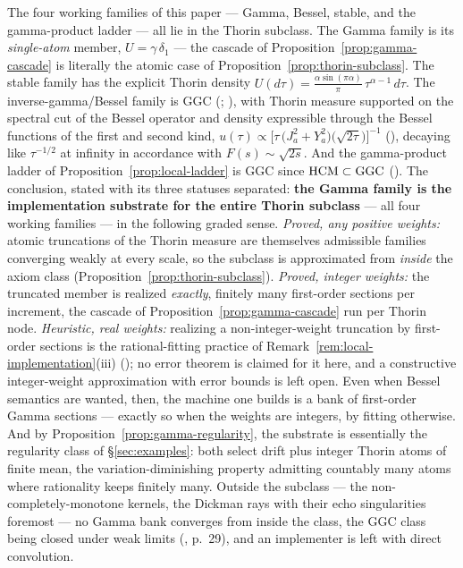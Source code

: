 The four working families of this paper --- Gamma, Bessel, stable, and the gamma-product
ladder --- all lie in the Thorin subclass. The Gamma family is its
\emph{single-atom} member, $U = \gamma\,\delta_1$ --- the cascade of
Proposition~\ref{prop:gamma-cascade} is literally the atomic case of
Proposition~\ref{prop:thorin-subclass}. The stable family has the explicit Thorin density
$U(d\tau) = \tfrac{\alpha \sin(\pi\alpha)}{\pi}\,\tau^{\alpha - 1}\,d\tau$. The
inverse-gamma/Bessel family is GGC (;
), with Thorin measure supported on the spectral cut of the
Bessel operator and density expressible through the Bessel functions of the first and second
kind, $u(\tau) \propto \bigl[\tau\,\bigl(J_a^2 + Y_a^2\bigr)\bigl(\sqrt{2\tau}\bigr)\bigr]^{-1}$
(), decaying like $\tau^{-1/2}$ at infinity in accordance with
$F(s) \sim \sqrt{2s}$. And the gamma-product ladder of Proposition~\ref{prop:local-ladder} is
GGC since $\mathrm{HCM} \subset \mathrm{GGC}$ (). The conclusion, stated
with its three statuses separated: \textbf{the Gamma family is the
implementation substrate for the entire Thorin subclass} --- all four working families ---
in the following graded sense. \emph{Proved, any positive weights:} atomic truncations of
the Thorin measure are themselves admissible families converging weakly at every scale, so
the subclass is approximated from \emph{inside} the axiom class
(Proposition~\ref{prop:thorin-subclass}). \emph{Proved, integer weights:} the truncated
member is realized \emph{exactly}, finitely many first-order sections per increment, the
cascade of Proposition~\ref{prop:gamma-cascade} run per Thorin node. \emph{Heuristic, real
weights:} realizing a non-integer-weight truncation by first-order sections is the
rational-fitting practice of Remark~\ref{rem:local-implementation}(iii)
(); no error theorem is claimed for it here, and a
constructive integer-weight approximation with error bounds is left open. Even when Bessel
semantics are wanted, then, the machine one builds is a bank of first-order Gamma sections
--- exactly so when the weights are integers, by fitting otherwise.
And by Proposition~\ref{prop:gamma-regularity}, the substrate is essentially the regularity
class of \S\ref{sec:examples}: both select drift plus integer Thorin atoms of finite mean,
the variation-diminishing property admitting countably many atoms where rationality keeps
finitely many.
Outside the subclass --- the non-completely-monotone kernels, the Dickman rays with their
echo singularities foremost --- no Gamma bank converges from inside the class, the GGC
class being closed under weak limits (, p.~29), and an
implementer is left with direct convolution.

